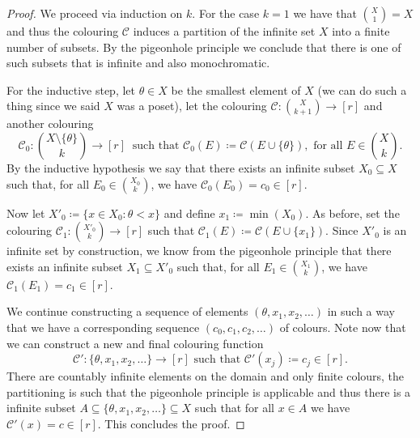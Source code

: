 \begin{proof}
    We proceed via induction on \(k\). For the case \(k = 1\) we have that
    \(\binom{X}{1} = X\) and thus the colouring \(\mathcal{C}\) induces a
    partition of the infinite set \(X\) into a finite number of subsets. By the
    pigeonhole principle we conclude that there is one of such subsets that is
    infinite and also monochromatic.

    For the inductive step, let \(\theta \in X\) be the smallest element of \(X\)
    (we can do such a thing since we said \(X\) was a poset), let the colouring
    \(\mathcal{C} : \binom{X}{k + 1} \to [r]\) and another colouring
    \[
        \mathcal{C}_0 : \binom{X \setminus \{\theta\} }{k} \longrightarrow [r]
        \ \text{ such that }
        \mathcal{C}_0(E) \coloneq \mathcal{C}(E \cup \{\theta\} ), \text{ for all }
        E \in \binom{X}{k}.
    \]
    By the inductive hypothesis we say that there exists an infinite subset \(X_0
    \subseteq X\) such that, for all \(E_0 \in \binom{X_0}{k}\), we have
    \(\mathcal{C}_0(E_0) = c_0 \in [r]\).

    Now let \(X'_0 \coloneq \{x \in X_0 \colon \theta < x\}\) and define \(x_1
    \coloneq \min(X_0)\). As before, set the colouring \(\mathcal{C}_1 :
    \binom{X'_0}{k} \to [r]\) such that \(\mathcal{C}_1(E) \coloneq \mathcal{C}(E
    \cup \{x_1\})\).  Since \(X'_0\) is an infinite set by construction, we know
    from the pigeonhole principle that there exists an infinite subset \(X_1
    \subseteq X'_0\) such that, for all \(E_1 \in \binom{X_1}{k}\), we have
    \(\mathcal{C}_1 (E_1) = c_1 \in [r]\).

    We continue constructing a sequence of elements \((\theta, x_1, x_2, \dots)\)
    in such a way that we have a corresponding sequence \((c_0, c_1, c_2, \dots)\)
    of colours. Note now that we can construct a new and final colouring function
    \[
        \mathcal{C}' : \{\theta, x_1, x_2, \dots\} \to [r] \text{ such that }
        \mathcal{C}'(x_j) \coloneq c_j \in [r].
    \]
    There are countably infinite elements on the domain and only finite colours, the
    partitioning is such that the pigeonhole principle is applicable and thus there
    is a infinite subset \(A \subseteq \{\theta, x_1, x_2, \dots\} \subseteq X\)
    such that for all \(x \in A\) we have \(\mathcal{C}'(x) = c \in [r]\).  This
    concludes the proof.
\end{proof}
